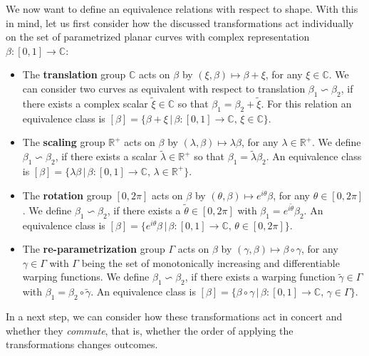 \noindent We now want to define an equivalence relations with respect to shape.
With this in mind, let us first consider how the discussed transformations act
individually on the set of parametrized planar curves with complex
representation $\beta : [0,1]
\rightarrow \mathbb{C}$:
\begin{itemize}
  \item
    The \textbf{translation} group $\mathbb{C}$ acts on $\beta$ by $(\xi, \beta)
    \mapsto \beta + \xi$, for any $\xi \in \mathbb{C}$.
    We can consider two curves as equivalent with respect to translation
    $\beta_1 \backsim \beta_2$, if there exists a complex scalar $\tilde\xi \in
    \mathbb{C}$ so that $\beta_1 = \beta_2  + \tilde\xi$.
    For this relation an equivalence class is $[\beta] = \{\beta + \xi\, |\,
    \beta : [0,1] \rightarrow \mathbb{C},\, \xi \in \mathbb{C}\}$.
  \item 
    The \textbf{scaling} group $\mathbb{R}^+$ acts on $\beta$ by $(\lambda, \beta)
    \mapsto \lambda \beta$, for any $\lambda \in \mathbb{R}^+$.
    We define $\beta_1 \backsim \beta_2$, if there exists a scalar
    $\tilde\lambda \in \mathbb{R}^+$ so that $\beta_1 = \tilde\lambda \beta_2$.
    An equivalence class is $[\beta] = \{\lambda\beta\,|\,\beta : [0,1]
    \rightarrow \mathbb{C},\, \lambda \in \mathbb{R}^+\}$.
  \item 
    The \textbf{rotation} group $[0,2\pi]$ acts on $\beta$ by $(\theta, \beta)
    \mapsto e^{i\theta} \beta$, for any $\theta \in [0,2\pi]$.
    We define $\beta_1 \backsim \beta_2$, if there exists a $\tilde\theta \in
    [0,2\pi]$ with $\beta_1 = e^{i\tilde\theta} \beta_2$.
    An equivalence class is $[\beta] = \{e^{i\theta}\beta\,|\, \beta : [0,1]
    \rightarrow \mathbb{C},\, \theta \in [0,2\pi]\}$.
  \item 
    The \textbf{re-parametrization} group $\Gamma$ acts on $\beta$ by $(\gamma,\beta)
    \mapsto \beta \circ \gamma$, for any $\gamma \in \Gamma$ with $\Gamma$
    being the set of monotonically increasing and differentiable warping
    functions.
    We define $\beta_1 \backsim \beta_2$, if there exists a warping function
    $\tilde\gamma \in \Gamma$ with $\beta_1 = \beta_2 \circ \tilde\gamma$.
    An equivalence class is $[\beta] = \{\beta \circ \gamma\,|\, \beta : [0,1]
    \rightarrow \mathbb{C},\, \gamma \in \Gamma\}$.
\end{itemize}
In a next step, we can consider how these transformations act in concert and
whether they \textit{commute}, that is, whether the order of applying the
transformations changes outcomes.
